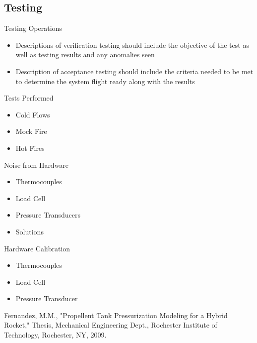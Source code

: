 \documentclass[10pt,a4paper]{article}
\begin{document}
\subsection{Testing}

Testing Operations
\begin{itemize}
	\item Descriptions of verification testing should include the objective of the test as well as testing results and any anomalies seen
	\item Description of acceptance testing should include the criteria needed to be met to determine the system flight ready along with the results
\end{itemize}

Tests Performed
\begin{itemize}
	\item Cold Flows
	\item Mock Fire
	\item Hot Fires
\end{itemize}

Noise from Hardware
\begin{itemize}
	\item Thermocouples
	\item Load Cell
	\item Pressure Transducers
	\item Solutions
\end{itemize}

Hardware Calibration
\begin{itemize}
	\item Thermocouples
	\item Load Cell
	\item Pressure Transducer
\end{itemize}

\begin{thebibliography}{10}
	
	Fernandez, M.M., 
	"Propellent Tank Pressurization Modeling for a Hybrid Rocket,"
	Thesis, Mechanical Engineering Dept., Rochester Institute of      
	Technology, 
	Rochester, NY, 2009.
	
\newpage
\end{thebibliography}
\end{document}
